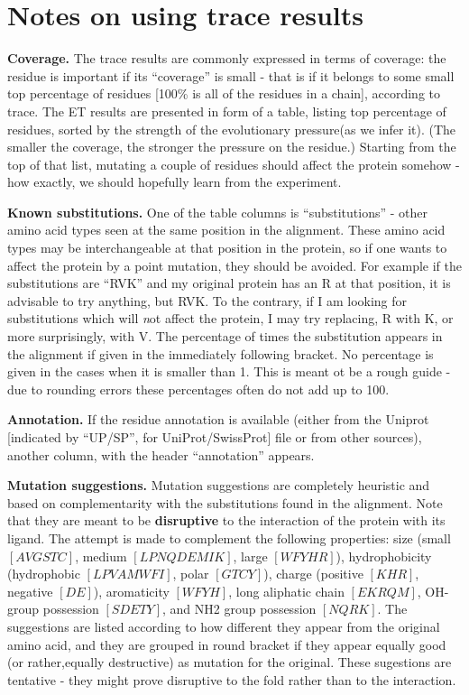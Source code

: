 \section{Notes on using trace results}

 {\bf Coverage.} The trace  results are commonly expressed in terms of coverage: the residue is
important if its ``coverage'' is small - that is if it belongs to some small top percentage of residues [100\% is
 all of the residues in a chain], according to trace.
The ET results are presented  in form of a table, listing top percentage of residues,
 sorted by the strength of the evolutionary pressure(as we infer it).
(The smaller the coverage, the stronger the pressure on the residue.) Starting from the top of that list,
mutating a couple of residues should affect the protein somehow -  how exactly, we should hopefully learn from
the experiment.

 {\bf Known substitutions.} One of the table columns is ``substitutions''
- other amino acid types seen at the same position in the alignment. These amino acid types may be interchangeable
at that position in the protein, so if one wants to affect the protein by a point mutation, they should be avoided.
For example if the substitutions are ``RVK'' and my original protein has an R at that position, it is advisable to
try anything, but RVK. To the contrary, if I am looking for substitutions which will {\emph not}  affect the protein,
I may try replacing, R with K, or more surprisingly, with V. The percentage of times the substitution appears in the
alignment if given in the immediately following bracket. No percentage is given in the cases when it is smaller than 1.
This is meant ot be a rough guide - due to rounding errors these percentages often do not add up to 100.

{\bf Annotation.} If the residue annotation is available (either from the Uniprot [indicated by 
``UP/SP'', for UniProt/SwissProt] file or from other sources), another column,
with the header ``annotation'' appears.

{\bf Mutation suggestions.} \label{mutnotes}
Mutation suggestions are completely heuristic and based on complementarity with the substitutions found
in the alignment. Note that they are meant to be {\bf disruptive} to the interaction of the protein with its ligand.
The attempt is made to complement the following properties: size (small $[AVGSTC]$, medium $[
LPNQDEMIK]$, large $[WFYHR]$), 
hydrophobicity (hydrophobic $[LPVAMWFI]$, polar $[GTCY]$), charge (positive $[KHR]$,
 negative $[DE]$), aromaticity $[WFYH]$, long aliphatic chain $[EKRQM]$, 
 OH-group possession $[SDETY]$, and NH2 group possession $[NQRK]$.
The suggestions are listed according to how different they appear from the original amino acid, 
and they are grouped in round bracket   
if they appear equally good (or rather,equally  destructive) as mutation for the original.
These sugestions are tentative - they might prove disruptive to the fold rather than to the interaction.
